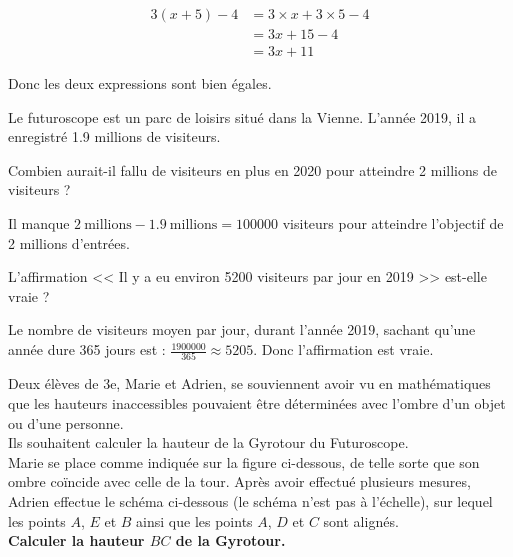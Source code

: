 \documentclass[../Cours.tex]{subfiles}
\begin{document}
\begin{questions}
    {\color{rouge}
        \begin{align*}
            3(x+5)-4 &= 3 \times x + 3 \times 5 - 4 \\ 
            &= 3x + 15 - 4 \\ 
            &= 3x + 11
        \end{align*}

        Donc les deux expressions sont bien égales.
    }
    

Le futuroscope est un parc de loisirs situé dans la Vienne. L'année 2019, il a enregistré \num{1.9} millions de visiteurs.

\question Combien aurait-il fallu de visiteurs en plus en 2020 pour atteindre 2 millions de visiteurs ?

{\color{rouge}
    Il manque $2~\mbox{millions} - \num{1.9}~\mbox{millions} = \num{100000}$ visiteurs pour atteindre l'objectif de 2 millions d'entrées.
}

\question L'affirmation << Il y a eu environ \num{5200} visiteurs par jour en 2019 >> est-elle vraie ?

{\color{rouge}
    Le nombre de visiteurs moyen par jour, durant l'année 2019, sachant qu'une année dure 365 jours est : $\frac{\num{1900000}}{365} \approx 5205$. Donc l'affirmation est vraie.
}

\question Deux élèves de 3e, Marie et Adrien, se souviennent avoir vu en mathématiques que les hauteurs inaccessibles pouvaient être déterminées avec l’ombre d'un objet ou d'une personne. \\
Ils souhaitent calculer la hauteur de la Gyrotour du Futuroscope.\\
Marie se place comme indiquée sur la figure ci-dessous, de telle sorte que son ombre coïncide avec celle de la tour. Après avoir effectué plusieurs mesures, Adrien effectue le schéma ci-dessous (le schéma n’est pas à l’échelle), sur lequel les points $A$, $E$ et $B$ ainsi que les points $A$, $D$ et $C$ sont alignés. \\
\textbf{Calculer la hauteur $BC$ de la Gyrotour.}


\end{questions}
\end{document}
